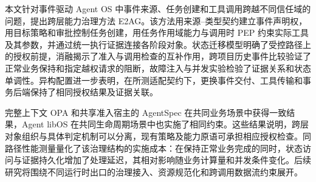 本文针对事件驱动 Agent OS 中事件来源、任务创建和工具调用跨越不同信任域的问题，提出跨层能力治理方法 E2AG。该方法用来源--类型契约建立事件声明权，用目标策略和审批控制任务创建，用任务作用域能力与调用时 PEP 约束实际工具及其参数，并通过统一执行证据连接各阶段对象。状态迁移模型明确了受控路径上的授权前提，消融揭示了准入与调用检查的互补作用，跨项目历史事件比较验证了正常业务保持和指定越权请求的阻断，故障注入与并发实验检验了证据关系和状态单调性。异构配置进一步表明，在所测适配契约下，更换事件交付、工具传输和事务后端保持了相同授权结果及证据关联。

完整上下文 OPA 和共享准入宿主的 AgentSpec 在共同业务场景中获得一致结果，Agent libOS 在共同生命周期场景中也实施了相同约束。这些结果说明，跨层对象组织与具体判定机制可以分离，现有策略及能力原语可承担相应授权检查。同路径性能测量量化了该治理结构的实施成本：在保持正常业务完成的同时，状态访问与证据持久化增加了处理延迟，其相对影响随业务计算量和并发条件变化。后续研究将围绕不同运行时出口的治理接入、资源规范化和跨调用数据流约束展开。

